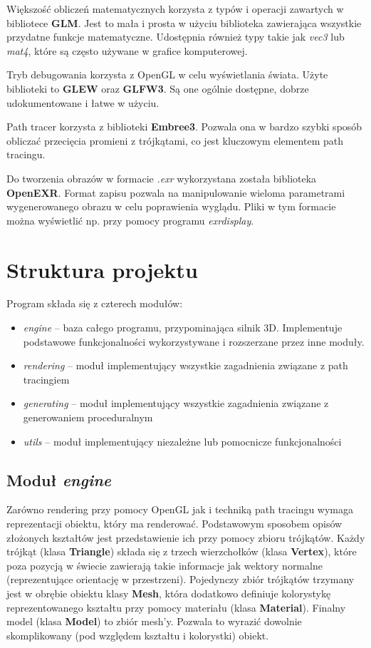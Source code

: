 \documentclass[inz,longabstract]{iithesis}
\begin{document}
        Większość obliczeń matematycznych korzysta z typów i operacji zawartych w bibliotece \textbf{GLM}. Jest to mała i prosta w użyciu biblioteka zawierająca wszystkie przydatne funkcje matematyczne. Udostępnia również typy takie jak \textit{vec3} lub \textit{mat4}, które są często używane w grafice komputerowej. 
        
        Tryb debugowania korzysta z OpenGL w celu wyświetlania świata. Użyte biblioteki to \textbf{GLEW} oraz \textbf{GLFW3}. Są one ogólnie dostępne, dobrze udokumentowane i łatwe w użyciu. 
        
        Path tracer korzysta z biblioteki \textbf{Embree3}. Pozwala ona w bardzo szybki sposób obliczać przecięcia promieni z trójkątami, co jest kluczowym elementem path tracingu. 
        
        Do tworzenia obrazów w formacie \textit{.exr} wykorzystana została biblioteka \textbf{OpenEXR}. Format zapisu pozwala na manipulowanie wieloma parametrami wygenerowanego obrazu w celu poprawienia wyglądu. 
        Pliki w tym formacie można wyświetlić np. przy pomocy programu \textit{exrdisplay}.
        
    \section{Struktura projektu}
        Program składa się z czterech modułów:
        \begin{itemize}
            \item \textit{engine} -- baza całego programu, przypominająca silnik 3D. Implementuje podstawowe funkcjonalności wykorzystywane i rozszerzane przez inne moduły. 
            \item \textit{rendering} -- moduł implementujący wszystkie zagadnienia związane z path tracingiem
            \item \textit{generating} -- moduł implementujący wszystkie zagadnienia związane z generowaniem proceduralnym
            \item \textit{utils} -- moduł implementujący niezależne lub pomocnicze funkcjonalności
        \end{itemize}
        
        \subsection{Moduł \textit{engine}}
            Zarówno rendering przy pomocy OpenGL jak i techniką path tracingu wymaga reprezentacji obiektu, który ma renderować. Podstawowym sposobem opisów złożonych kształtów jest przedstawienie ich przy pomocy zbioru trójkątów. Każdy trójkąt (klasa \textbf{Triangle}) składa się z trzech wierzchołków (klasa \textbf{Vertex}), które poza pozycją w świecie zawierają takie informacje jak wektory normalne (reprezentujące orientację w przestrzeni). Pojedynczy zbiór trójkątów trzymany jest w obrębie obiektu klasy \textbf{Mesh}, która dodatkowo definiuje kolorystykę reprezentowanego kształtu przy pomocy materiału (klasa \textbf{Material}). Finalny model (klasa \textbf{Model}) to zbiór mesh'y. Pozwala to wyrazić dowolnie skomplikowany (pod względem kształtu i kolorystki) obiekt. 
            
\end{document}
